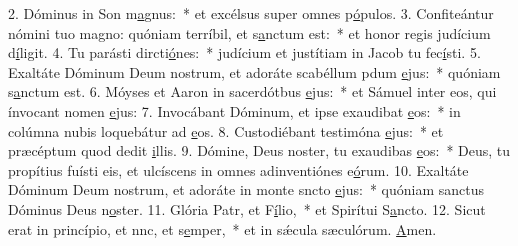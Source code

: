 2. Dóminus in Son m\uline{a}gnus:~* et excélsus super omnes p\uline{ó}pulos.
3. Confiteántur nómini tuo magno: quóniam terríbil, et s\uline{a}nctum est:~* et honor regis judícium d\uline{í}ligit.
4. Tu parásti dircti\uline{ó}nes:~* judícium et justítiam in Jacob tu fec\uline{í}sti.
5. Exaltáte Dóminum Deum nostrum, et adoráte scabéllum pdum \uline{e}jus:~* quóniam s\uline{a}nctum est.
6. Móyses et Aaron in sacerdótbus \uline{e}jus:~* et Sámuel inter eos, qui ínvocant nomen \uline{e}jus:
7. Invocábant Dóminum, et ipse exaudibat \uline{e}os:~* in colúmna nubis loquebátur ad \uline{e}os.
8. Custodiébant testimóna \uline{e}jus:~* et præcéptum quod dedit \uline{i}llis.
9. Dómine, Deus noster, tu exaudibas \uline{e}os:~* Deus, tu propítius fuísti eis, et ulcíscens in omnes adinventiónes e\uline{ó}rum.
10. Exaltáte Dóminum Deum nostrum, et adoráte in monte sncto \uline{e}jus:~* quóniam sanctus Dóminus Deus n\uline{o}ster.
11. Glória Patr, et F\uline{í}lio,~* et Spirítui S\uline{a}ncto.
12. Sicut erat in princípio, et nnc, et s\uline{e}mper,~* et in sǽcula sæculórum. \uline{A}men.
